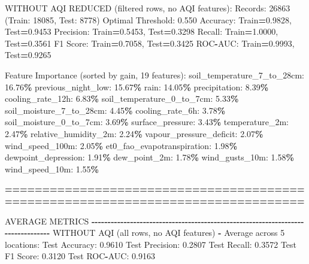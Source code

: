 \documentclass[
  letterpaper,
  DIV=11,
  numbers=noendperiod]{scrartcl}
\newenvironment{Shaded}{\begin{snugshade}}{\end{snugshade}}
\newcommand{\BuiltInTok}[1]{#1}
\newcommand{\DecValTok}[1]{\textcolor[rgb]{0.00,0.00,0.81}{#1}}
\newcommand{\FloatTok}[1]{\textcolor[rgb]{0.00,0.00,0.81}{#1}}
\newcommand{\NormalTok}[1]{#1}
\newcommand{\OperatorTok}[1]{\textcolor[rgb]{0.81,0.36,0.00}{\textbf{#1}}}
\begin{document}
\begin{Shaded}
\begin{Highlighting}[]
\NormalTok{WITHOUT AQI REDUCED (filtered rows, no AQI features):}
\NormalTok{  Records: }\DecValTok{26863}\NormalTok{ (Train: }\DecValTok{18085}\NormalTok{, Test: }\DecValTok{8778}\NormalTok{)}
\NormalTok{  Optimal Threshold: }\FloatTok{0.550}
\NormalTok{  Accuracy: Train}\OperatorTok{=}\FloatTok{0.9828}\NormalTok{, Test}\OperatorTok{=}\FloatTok{0.9453}
\NormalTok{  Precision: Train}\OperatorTok{=}\FloatTok{0.5453}\NormalTok{, Test}\OperatorTok{=}\FloatTok{0.3298}
\NormalTok{  Recall: Train}\OperatorTok{=}\FloatTok{1.0000}\NormalTok{, Test}\OperatorTok{=}\FloatTok{0.3561}
\NormalTok{  F1 Score: Train}\OperatorTok{=}\FloatTok{0.7058}\NormalTok{, Test}\OperatorTok{=}\FloatTok{0.3425}
\NormalTok{  ROC}\OperatorTok{{-}}\NormalTok{AUC: Train}\OperatorTok{=}\FloatTok{0.9993}\NormalTok{, Test}\OperatorTok{=}\FloatTok{0.9265}

\NormalTok{  Feature Importance (}\BuiltInTok{sorted}\NormalTok{ by gain, }\DecValTok{19}\NormalTok{ features):}
\NormalTok{    soil\_temperature\_7\_to\_28cm: }\FloatTok{16.76}\OperatorTok{\%}
\NormalTok{    previous\_night\_low: }\FloatTok{15.67}\OperatorTok{\%}
\NormalTok{    rain: }\FloatTok{14.05}\OperatorTok{\%}
\NormalTok{    precipitation: }\FloatTok{8.39}\OperatorTok{\%}
\NormalTok{    cooling\_rate\_12h: }\FloatTok{6.83}\OperatorTok{\%}
\NormalTok{    soil\_temperature\_0\_to\_7cm: }\FloatTok{5.33}\OperatorTok{\%}
\NormalTok{    soil\_moisture\_7\_to\_28cm: }\FloatTok{4.45}\OperatorTok{\%}
\NormalTok{    cooling\_rate\_6h: }\FloatTok{3.78}\OperatorTok{\%}
\NormalTok{    soil\_moisture\_0\_to\_7cm: }\FloatTok{3.69}\OperatorTok{\%}
\NormalTok{    surface\_pressure: }\FloatTok{3.43}\OperatorTok{\%}
\NormalTok{    temperature\_2m: }\FloatTok{2.47}\OperatorTok{\%}
\NormalTok{    relative\_humidity\_2m: }\FloatTok{2.24}\OperatorTok{\%}
\NormalTok{    vapour\_pressure\_deficit: }\FloatTok{2.07}\OperatorTok{\%}
\NormalTok{    wind\_speed\_100m: }\FloatTok{2.05}\OperatorTok{\%}
\NormalTok{    et0\_fao\_evapotranspiration: }\FloatTok{1.98}\OperatorTok{\%}
\NormalTok{    dewpoint\_depression: }\FloatTok{1.91}\OperatorTok{\%}
\NormalTok{    dew\_point\_2m: }\FloatTok{1.78}\OperatorTok{\%}
\NormalTok{    wind\_gusts\_10m: }\FloatTok{1.58}\OperatorTok{\%}
\NormalTok{    wind\_speed\_10m: }\FloatTok{1.55}\OperatorTok{\%}

\OperatorTok{================================================================================}

\NormalTok{AVERAGE METRICS}
\OperatorTok{{-}{-}{-}{-}{-}{-}{-}{-}{-}{-}{-}{-}{-}{-}{-}{-}{-}{-}{-}{-}{-}{-}{-}{-}{-}{-}{-}{-}{-}{-}{-}{-}{-}{-}{-}{-}{-}{-}{-}{-}{-}{-}{-}{-}{-}{-}{-}{-}{-}{-}{-}{-}{-}{-}{-}{-}{-}{-}{-}{-}{-}{-}{-}{-}{-}{-}{-}{-}{-}{-}{-}{-}{-}{-}{-}{-}{-}{-}{-}{-}}
\NormalTok{WITHOUT AQI (}\BuiltInTok{all}\NormalTok{ rows, no AQI features) }\OperatorTok{{-}}\NormalTok{ Average across }\DecValTok{5}\NormalTok{ locations:}
\NormalTok{  Test Accuracy: }\FloatTok{0.9610}
\NormalTok{  Test Precision: }\FloatTok{0.2807}
\NormalTok{  Test Recall: }\FloatTok{0.3572}
\NormalTok{  Test F1 Score: }\FloatTok{0.3120}
\NormalTok{  Test ROC}\OperatorTok{{-}}\NormalTok{AUC: }\FloatTok{0.9163}


\end{Highlighting}
\end{Shaded}
\end{document}
